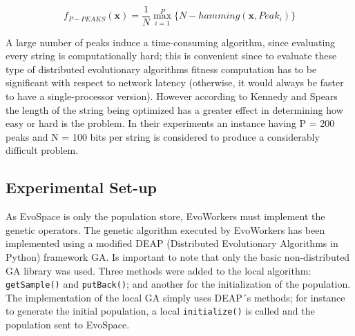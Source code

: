\documentclass{llncs}
\begin{document}
\begin{equation}
f_{P-PEAKS}(\mathbf{x})=\frac{1}{N} \overset{P}{\max_{i=1}} \{N-hamming(\mathbf{x},Peak_i)   \}
\end{equation}

A large number of peaks induce a time-consuming algorithm,
since evaluating every string is computationally hard; this is
convenient since to evaluate these type of distributed evolutionary
algorithms fitness computation has to be significant with respect to
network latency (otherwise, it would always be faster to have a
single-processor version). However
according to Kennedy and Spears \cite{Kennedy:1998ch} the length of
the string being optimized has a greater effect in determining how
easy or hard is the problem. In their experiments an instance having P
= 200 peaks and N = 100 bits per string is considered to produce a
considerably difficult problem.

\subsection{Experimental Set-up}
As EvoSpace is only the population store, EvoWorkers must implement 
the genetic operators. The genetic algorithm executed by EvoWorkers has been implemented 
using a modified DEAP (Distributed Evolutionary Algorithms in Python) 
framework \cite{DEAP_JMLR2012} GA. Is important to note that only the basic non-distributed GA 
library was used. Three methods were added to the local algorithm: 
{ \tt  getSample()} and  {\tt putBack()}; and  another for the  initialization 
of the population. The implementation of the local GA simply uses DEAP´s methods; for instance to 
generate the initial population, a local {\tt initialize()} is called 
and the population sent to EvoSpace.
\end{document}
